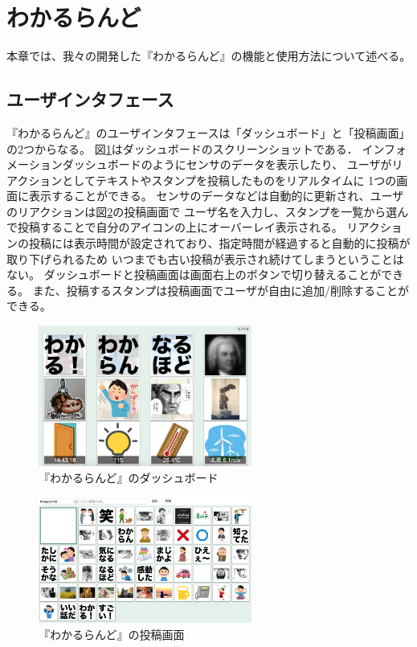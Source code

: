 \section{わかるらんど}
本章では、我々の開発した『わかるらんど』の機能と使用方法について述べる。

\subsection{ユーザインタフェース}
『わかるらんど』のユーザインタフェースは「ダッシュボード」と「投稿画面」の2つからなる。
図\ref{dashboard}はダッシュボードのスクリーンショットである．
インフォメーションダッシュボードのようにセンサのデータを表示したり、
ユーザがリアクションとしてテキストやスタンプを投稿したものをリアルタイムに
1つの画面に表示することができる。
センサのデータなどは自動的に更新され、ユーザのリアクションは図\ref{console}の投稿画面で
ユーザ名を入力し、スタンプを一覧から選んで投稿することで自分のアイコンの上にオーバーレイ表示される。
リアクションの投稿には表示時間が設定されており、指定時間が経過すると自動的に投稿が取り下げられるため
いつまでも古い投稿が表示され続けてしまうということはない。
ダッシュボードと投稿画面は画面右上のボタンで切り替えることができる。
また、投稿するスタンプは投稿画面でユーザが自由に追加/削除することができる。

\begin{figure}[h]
\centering
\includegraphics[width=7cm]{images/dashboard.png}
\caption{『わかるらんど』のダッシュボード}
\label{dashboard}
\end{figure}

\begin{figure}[h]
\centering
\includegraphics[width=7cm]{images/console.png}
\caption{『わかるらんど』の投稿画面}
\label{console}
\end{figure}

